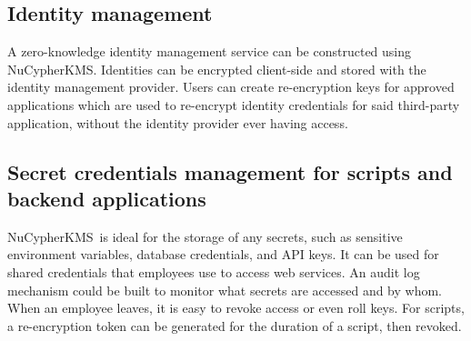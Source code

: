 \documentclass[notitlepage,longbibliography]{revtex4-1}
\newcommand{\kms}{NuCypherKMS}
\begin{document}
\subsection{Identity management}
A zero-knowledge identity management service can be constructed using \kms. Identities can be encrypted client-side and stored with the
identity management provider. Users can create re-encryption keys for approved applications which are used to re-encrypt identity
credentials for said third-party application, without the identity provider ever having access.

\subsection{Secret credentials management for scripts and backend applications}
\kms~is ideal for the storage of any secrets, such as sensitive environment variables, database credentials, and API keys.
It can be used for shared credentials that employees use to access web services.
An audit log mechanism could be built to monitor what secrets are accessed and by whom.
When an employee leaves, it is easy to revoke access or even roll keys.
For scripts, a re-encryption token can be generated for the duration of a script, then revoked.


\end{document}
